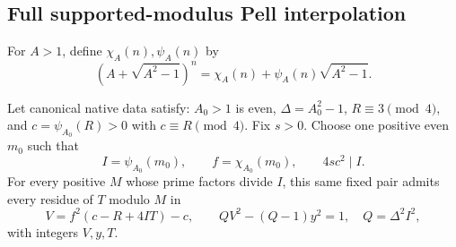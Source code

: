 \subsection{Full supported-modulus Pell interpolation}\label{sec:interpolation}
For $A>1$, define $\chi_A(n),\psi_A(n)$ by
\[
 (A+\sqrt{A^2-1})^n=\chi_A(n)+\psi_A(n)\sqrt{A^2-1}.
\]
\begin{theorem}\label{thm:interpolation}
Let canonical native data satisfy: $A_0>1$ is even, $\Delta=A_0^2-1$, $R\equiv3\pmod4$, and $c=\psi_{A_0}(R)>0$ with $c\equiv R\pmod4$. Fix $s>0$. Choose one positive even $m_0$ such that
\[
 I=\psi_{A_0}(m_0),\qquad f=\chi_{A_0}(m_0),\qquad4sc^2\mid I.
\]
For every positive $M$ whose prime factors divide $I$, this same fixed pair admits every residue of $T$ modulo $M$ in
\[
 V=f^2(c-R+4IT)-c,\qquad QV^2-(Q-1)y^2=1,\quad Q=\Delta^2I^2,
\]
with integers $V,y,T$.
\end{theorem}
